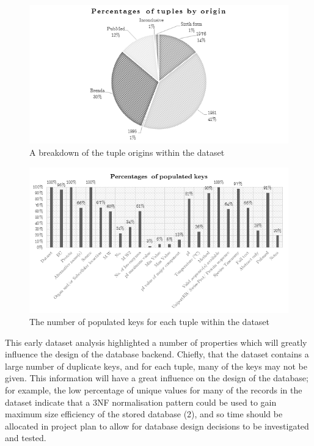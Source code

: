 \documentclass[12pt,a4paper]{article}
\begin{document}
\begin{figure}[H]
\centering
\includegraphics{assets/chart-dataset-origin.png}
\caption{A breakdown of the tuple origins within the dataset}
\label{fig:chart-dataset-origin}
\end{figure}

\newpage
\begin{figure}[H]
\centering
\includegraphics{assets/chart-dataset-populated.png}
\caption{The number of populated keys for each tuple within the dataset}
\label{fig:chart-dataset-populated}
\end{figure}

This early dataset analysis highlighted a number of properties which will
greatly influence the design of the database backend. Chiefly, that the dataset
contains a large number of duplicate keys, and for each tuple, many of the keys
may not be given. This information will have a great influence on the design of
the database; for example, the low percentage of unique values for many of the
records in the dataset indicate that a 3NF normalisation pattern could be used
to gain maximum size efficiency of the stored database (2), and so time should
be allocated in project plan to allow for database design decisions to be
investigated and tested.
\end{document}
